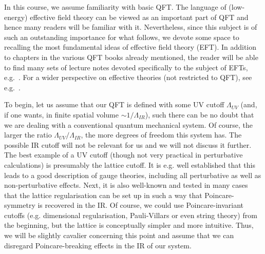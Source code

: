 \documentclass[12pt]{article}
\numberwithin{equation}{section}
\begin{document}
In this course, we assume familiarity with basic QFT. The language of (low-energy) effective field theory can be viewed as an important part of QFT
and hence many readers will be familiar with it. Nevertheless, since this subject is of such an outstanding importance for what follows, we devote some space to recalling the most fundamental ideas of effective field theory (EFT). In addition to chapters in the various QFT books already mentioned, the reader will be able to find many sets of lecture notes devoted specifically to the subject of EFTs, e.g.~\cite{Georgi:1994qn, Manohar:1996cq, Pich:1998xt, Luty:2005sn, Kaplan:2005es, Cohen:2019wxr}. For a wider perspective on effective theories (not restricted to QFT), see e.g.~\cite{Wells:2012rla}.

To begin, let us assume that our QFT is defined with some UV cutoff $\Lambda_{UV}$ (and, if one wants, in finite spatial volume $\sim 1/\Lambda_{IR}$), such there can be no doubt that we are dealing with a conventional quantum mechanical system. Of course, the larger the ratio $\Lambda_{UV}/\Lambda_{IR}$, the more degrees of freedom this system has. The possible IR cutoff will not be relevant for us and we will not discuss it further. The best example of a UV cutoff (though not very practical in perturbative calculations) is presumably the lattice cutoff. It is e.g. well established that this leads to a good description of gauge theories, including all perturbative as well as non-perturbative effects. Next, it is also well-known and tested in many cases that the lattice regularisation can be set up in such a way that Poincare-symmetry is recovered in the IR. Of course, we could use Poincare-invariant cutoffs (e.g. dimensional regularisation, Pauli-Villars or even string theory) from the beginning, but the lattice is conceptually simpler and more intuitive. Thus, we will be slightly cavalier concerning this point and assume that we can disregard Poincare-breaking effects in the IR of our system.
\end{document}
